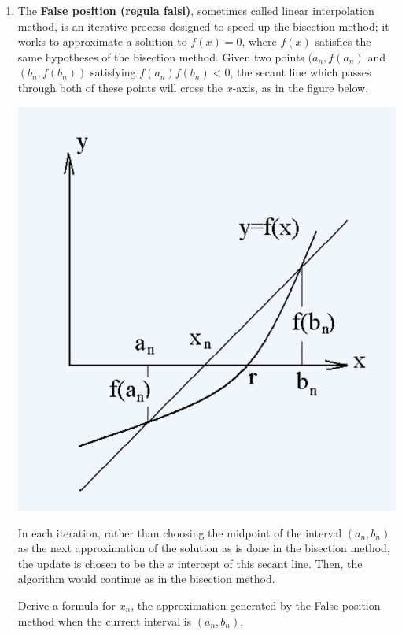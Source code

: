 \documentclass[12pt]{article}
\newif\ifans
\begin{document}
\begin{enumerate}
\item The  {\bf False position (regula falsi)}, sometimes called linear interpolation method, is an iterative process designed to speed up the bisection method; it works to approximate a solution to $f(x)=0$, where $f(x)$ satisfies the same hypotheses of the bisection method.  Given two points $(a_n,f(a_n)$ and $(b_n,f(b_n))$ satisfying $f(a_n)f(b_n)<0$, the secant line which passes through both of these points will cross the $x$-axis, as in the figure below.
\begin{center}
\includegraphics[scale=0.5]{LinearInterp.png}
\end{center}
In each iteration, rather than choosing the midpoint of the interval $(a_n,b_n)$ as the next approximation of the solution as is done in the bisection method, the update is chosen to be the $x$ intercept of this secant line.  Then, the algorithm would continue as in the bisection method.

Derive a formula for $x_n$, the approximation generated by the False position method when the current interval is $(a_n,b_n)$.

\ifans{\fbox{$x_{n} = a_n - \frac{f(a_n)(b_n-a_n)}{f(b_n)-f(a_n)}$}} \fi

\end{enumerate}
\end{document}

